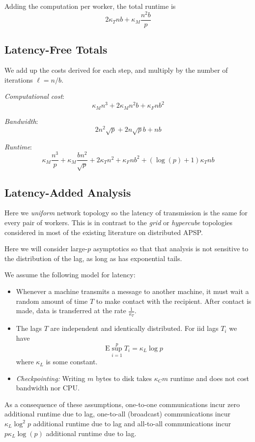 \documentclass{article} %
\begin{document}
Adding the computation per worker, the total runtime is
\[
2\kappa_T nb + \kappa_M \frac{n^2b}{p}
\]

\subsection{Latency-Free Totals}

We add up the costs derived for each step, and multiply by the number of iterations $\ell = n/b$.

\emph{Computational cost}:
\[
\kappa_M n^3 + 2\kappa_M n^2 b + \kappa_F n b^2
\]

\emph{Bandwidth}:
\[
2n^2 \sqrt{p} + 2n \sqrt{p} b + nb
\]

\emph{Runtime}:
\[
\kappa_M \frac{n^3}{p} + \kappa_M \frac{bn^2}{\sqrt{p}} + 2\kappa_T n^2 + \kappa_F nb^2 + (\log(p) + 1)\kappa_T nb
\]

\subsection{Latency-Added Analysis}

Here we \emph{uniform} network topology so the latency of transmission
is the same for every pair of workers.  This is in contrast to the
\emph{grid} or \emph{hypercube} topologies considered in most of the
existing literature on distributed APSP.

Here we will consider large-$p$ asymptotics so that that analysis is
not sensitive to the distribution of the lag, as long as has
exponential tails.

We assume the following model for latency:
\begin{itemize}
\item Whenever a machine transmits a message to another machine, it
  must wait a random amount of time $T$ to make contact with the
  recipient.  After contact is made, data is transferred at the rate
  $\frac{1}{\kappa_T}$.
\item The lags $T$ are independent and identically distributed.
For iid lags $T_i$ we have
\[
\text{E} \sup_{i=1}^p T_i = \kappa_L \log p
\]
where $\kappa_L$ is some constant.
\item \emph{Checkpointing:} Writing $m$ bytes to disk takes $\kappa_C
  m$ runtime and does not cost bandwidth nor CPU.
\end{itemize}

As a consequence of these assumptions, one-to-one communications incur
zero additional runtime due to lag, one-to-all (broadcast)
communications incur $\kappa_L \log^2 p$ additional runtime due to
lag and all-to-all communications incur $p \kappa_L \log(p)$ additional
runtime due to lag.
\end{document}
